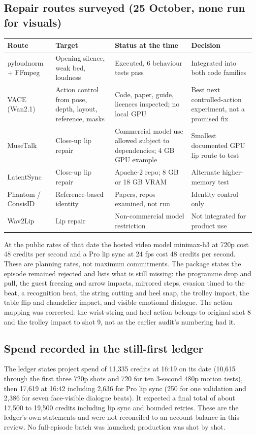 \documentclass[11pt,a4paper]{article}
\begin{document}
\subsection{Repair routes surveyed (25 October, none run for visuals)}
\begin{longtable}{@{}P{3.0cm}P{4.2cm}P{4.8cm}P{3.5cm}@{}}
\toprule \textbf{Route} & \textbf{Target} & \textbf{Status at the time} & \textbf{Decision}\\ \midrule\endhead
pyloudnorm + FFmpeg & Opening silence, weak bed, loudness & Executed, 6 behaviour tests pass & Integrated into both code families\\
VACE (Wan2.1) & Action control from pose, depth, layout, reference, masks & Code, paper, guide, licences inspected; no local GPU & Best next controlled-action experiment, not a promised fix\\
MuseTalk & Close-up lip repair & Commercial model use allowed subject to dependencies; 4 GB GPU example & Smallest documented GPU lip route to test\\
LatentSync & Close-up lip repair & Apache-2 repo; 8 GB or 18 GB VRAM & Alternate higher-memory test\\
Phantom / ConsisID & Reference-based identity & Papers, repos examined, not run & Identity control only\\
Wav2Lip & Lip repair & Non-commercial model restriction & Not integrated for product use\\
\bottomrule
\end{longtable}
At the public rates of that date the hosted video model minimax-h3 at 720p cost 48 credits per second and a Pro lip sync at 24 fps cost 48 credits per second. These are planning rates, not maximum commitments. The package states the episode remained rejected and lists what is still missing: the programme drop and pull, the guest freezing and arrow impacts, mirrored steps, evasion timed to the beat, a recognition beat, the string cutting and heel snap, the trolley impact, the table flip and chandelier impact, and visible emotional dialogue. The action mapping was corrected: the wrist-string and heel action belongs to original shot 8 and the trolley impact to shot 9, not as the earlier audit's numbering had it.

\subsection{Spend recorded in the still-first ledger}
The ledger states project spend of 11,335 credits at 16:19 on its date (10,615 through the first three 720p shots and 720 for ten 3-second 480p motion tests), then 17,619 at 16:42 including 2,636 for Pro lip sync (250 for one validation and 2,386 for seven face-visible dialogue beats). It expected a final total of about 17,500 to 19,500 credits including lip sync and bounded retries. These are the ledger's own statements and were not reconciled to an account balance in this review. No full-episode batch was launched; production was shot by shot.
\end{document}
